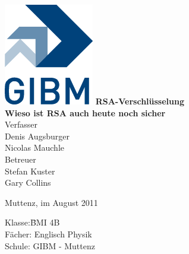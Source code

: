 \begin{titlepage}
\sffamily
\centering
\includegraphics{images/gibm_logo.png}
\vfill
{\bfseries\Huge RSA-Verschlüsselung}\\
\vfill
{\bfseries\Large Wieso ist RSA auch heute noch sicher}\\
\vfill
Verfasser\\[1ex]
Denis Augsburger\\
Nicolas Mauchle\\
\vfill
Betreuer\\[1ex]
{\large Stefan Kuster}\\
{\large Gary Collins}\\
\vfill
\raggedright
\small
Muttenz, im August 2011\\[2cm]
\begin{tabbing}
Klasse:\quad\quad\quad \=BMI 4B\\
Fächer: \> Englisch Physik \\
Schule: \> GIBM - Muttenz
\end{tabbing}
\end{titlepage}
